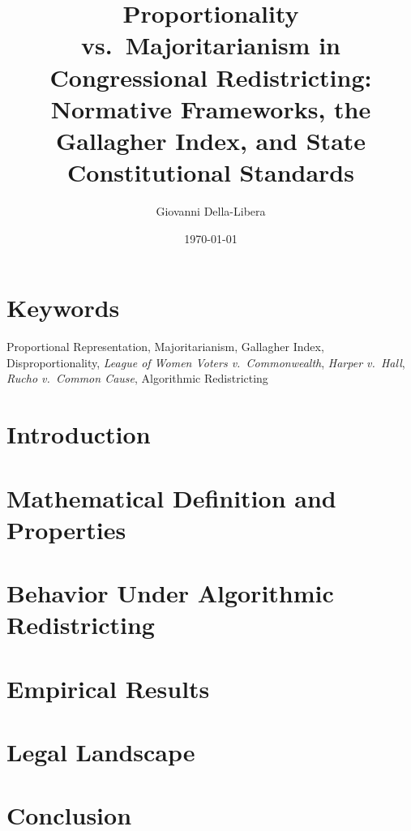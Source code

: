 \documentclass[12pt]{article}
\title{\textbf{Proportionality vs.\ Majoritarianism in Congressional Redistricting:\\
Normative Frameworks, the Gallagher Index, and State Constitutional Standards}}
\author{Giovanni Della-Libera}
\date{\today}
\begin{document}
\maketitle

\begin{abstract}

\end{abstract}

\section*{Keywords}
Proportional Representation, Majoritarianism, Gallagher Index, Disproportionality,
\textit{League of Women Voters v.\ Commonwealth}, \textit{Harper v.\ Hall},
\textit{Rucho v.\ Common Cause}, Algorithmic Redistricting

\section{Introduction}


\section{Mathematical Definition and Properties}


\section{Behavior Under Algorithmic Redistricting}


\section{Empirical Results}


\section{Legal Landscape}


\section{Conclusion}




\end{document}
